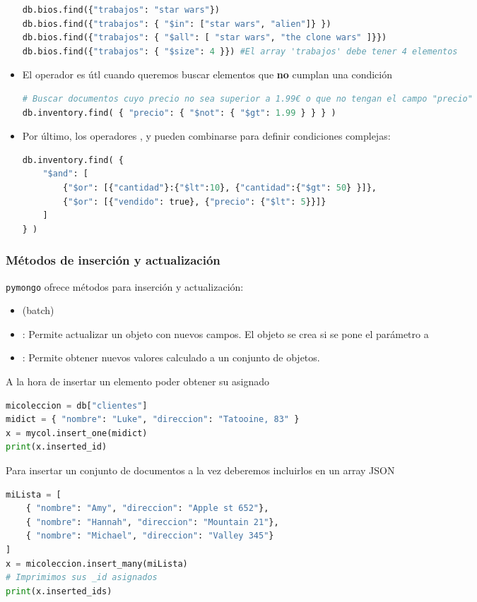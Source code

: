\begin{itemize}
\begin{lstlisting}[language=python]
db.bios.find({"trabajos": "star wars"})
db.bios.find({"trabajos": { "$in": ["star wars", "alien"]} })
db.bios.find({"trabajos": { "$all": [ "star wars", "the clone wars" ]}})
db.bios.find({"trabajos": { "$size": 4 }}) #El array 'trabajos' debe tener 4 elementos
\end{lstlisting}
\item El operador  es útl cuando queremos buscar elementos que \textbf{no} cumplan una condición
\begin{lstlisting}[language=python]
# Buscar documentos cuyo precio no sea superior a 1.99€ o que no tengan el campo "precio"
db.inventory.find( { "precio": { "$not": { "$gt": 1.99 } } } )
\end{lstlisting}
\item Por último, los operadores ,  y  pueden combinarse para definir condiciones complejas:
\begin{lstlisting}[language=python]
db.inventory.find( { 
	"$and": [
		{"$or": [{"cantidad"}:{"$lt":10}, {"cantidad":{"$gt": 50} }]},
		{"$or": [{"vendido": true}, {"precio": {"$lt": 5}}]}
	]
} )
\end{lstlisting}
\end{itemize}
\subsubsection{Métodos de inserción y actualización}
\texttt{pymongo} ofrece métodos para inserción y actualización:
\begin{itemize}
	\item {} (batch)
	\item {}: Permite actualizar un objeto con nuevos campos. El objeto se crea si se pone el parámetro  a 
	\item {}: Permite obtener nuevos valores calculado a un conjunto de objetos.
\end{itemize}
A la hora de insertar un elemento poder obtener su  asignado
\begin{lstlisting}[language=python]
micoleccion = db["clientes"]
midict = { "nombre": "Luke", "direccion": "Tatooine, 83" }
x = mycol.insert_one(midict)
print(x.inserted_id)
\end{lstlisting}
Para insertar un conjunto de documentos a la vez deberemos incluirlos en un array JSON
\begin{lstlisting}[language=python]
miLista = [
	{ "nombre": "Amy", "direccion": "Apple st 652"},
	{ "nombre": "Hannah", "direccion": "Mountain 21"},
	{ "nombre": "Michael", "direccion": "Valley 345"}
]
x = micoleccion.insert_many(miLista)
# Imprimimos sus _id asignados
print(x.inserted_ids)
\end{lstlisting}